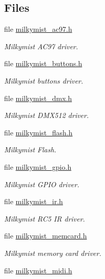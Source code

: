 \subsection*{Files}
\begin{DoxyCompactItemize}
\item 
file \mbox{\hyperlink{milkymist__ac97_8h}{milkymist\+\_\+ac97.\+h}}
\begin{DoxyCompactList}\small\item\em Milkymist A\+C97 driver. \end{DoxyCompactList}\item 
file \mbox{\hyperlink{milkymist__buttons_8h}{milkymist\+\_\+buttons.\+h}}
\begin{DoxyCompactList}\small\item\em Milkymist buttons driver. \end{DoxyCompactList}\item 
file \mbox{\hyperlink{milkymist__dmx_8h}{milkymist\+\_\+dmx.\+h}}
\begin{DoxyCompactList}\small\item\em Milkymist D\+M\+X512 driver. \end{DoxyCompactList}\item 
file \mbox{\hyperlink{milkymist__flash_8h}{milkymist\+\_\+flash.\+h}}
\begin{DoxyCompactList}\small\item\em Milkymist Flash. \end{DoxyCompactList}\item 
file \mbox{\hyperlink{milkymist__gpio_8h}{milkymist\+\_\+gpio.\+h}}
\begin{DoxyCompactList}\small\item\em Milkymist G\+P\+IO driver. \end{DoxyCompactList}\item 
file \mbox{\hyperlink{milkymist__ir_8h}{milkymist\+\_\+ir.\+h}}
\begin{DoxyCompactList}\small\item\em Milkymist R\+C5 IR driver. \end{DoxyCompactList}\item 
file \mbox{\hyperlink{milkymist__memcard_8h}{milkymist\+\_\+memcard.\+h}}
\begin{DoxyCompactList}\small\item\em Milkymist memory card driver. \end{DoxyCompactList}\item 
file \mbox{\hyperlink{milkymist__midi_8h}{milkymist\+\_\+midi.\+h}}

\end{DoxyCompactItemize}
